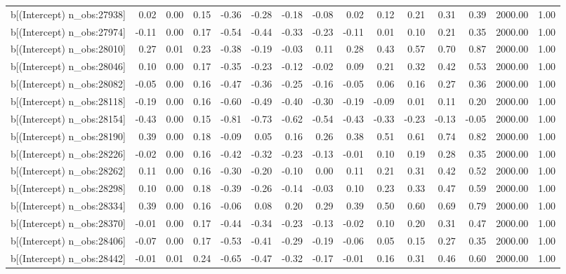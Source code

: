 \begin{table}[ht]
\begin{tabular}{rrrrrrrrrrrrrrr}
  b[(Intercept) n\_obs:27938] & 0.02 & 0.00 & 0.15 & -0.36 & -0.28 & -0.18 & -0.08 & 0.02 & 0.12 & 0.21 & 0.31 & 0.39 & 2000.00 & 1.00 \\ 
  b[(Intercept) n\_obs:27974] & -0.11 & 0.00 & 0.17 & -0.54 & -0.44 & -0.33 & -0.23 & -0.11 & 0.01 & 0.10 & 0.21 & 0.35 & 2000.00 & 1.00 \\ 
  b[(Intercept) n\_obs:28010] & 0.27 & 0.01 & 0.23 & -0.38 & -0.19 & -0.03 & 0.11 & 0.28 & 0.43 & 0.57 & 0.70 & 0.87 & 2000.00 & 1.00 \\ 
  b[(Intercept) n\_obs:28046] & 0.10 & 0.00 & 0.17 & -0.35 & -0.23 & -0.12 & -0.02 & 0.09 & 0.21 & 0.32 & 0.42 & 0.53 & 2000.00 & 1.00 \\ 
  b[(Intercept) n\_obs:28082] & -0.05 & 0.00 & 0.16 & -0.47 & -0.36 & -0.25 & -0.16 & -0.05 & 0.06 & 0.16 & 0.27 & 0.36 & 2000.00 & 1.00 \\ 
  b[(Intercept) n\_obs:28118] & -0.19 & 0.00 & 0.16 & -0.60 & -0.49 & -0.40 & -0.30 & -0.19 & -0.09 & 0.01 & 0.11 & 0.20 & 2000.00 & 1.00 \\ 
  b[(Intercept) n\_obs:28154] & -0.43 & 0.00 & 0.15 & -0.81 & -0.73 & -0.62 & -0.54 & -0.43 & -0.33 & -0.23 & -0.13 & -0.05 & 2000.00 & 1.00 \\ 
  b[(Intercept) n\_obs:28190] & 0.39 & 0.00 & 0.18 & -0.09 & 0.05 & 0.16 & 0.26 & 0.38 & 0.51 & 0.61 & 0.74 & 0.82 & 2000.00 & 1.00 \\ 
  b[(Intercept) n\_obs:28226] & -0.02 & 0.00 & 0.16 & -0.42 & -0.32 & -0.23 & -0.13 & -0.01 & 0.10 & 0.19 & 0.28 & 0.35 & 2000.00 & 1.00 \\ 
  b[(Intercept) n\_obs:28262] & 0.11 & 0.00 & 0.16 & -0.30 & -0.20 & -0.10 & 0.00 & 0.11 & 0.21 & 0.31 & 0.42 & 0.52 & 2000.00 & 1.00 \\ 
  b[(Intercept) n\_obs:28298] & 0.10 & 0.00 & 0.18 & -0.39 & -0.26 & -0.14 & -0.03 & 0.10 & 0.23 & 0.33 & 0.47 & 0.59 & 2000.00 & 1.00 \\ 
  b[(Intercept) n\_obs:28334] & 0.39 & 0.00 & 0.16 & -0.06 & 0.08 & 0.20 & 0.29 & 0.39 & 0.50 & 0.60 & 0.69 & 0.79 & 2000.00 & 1.00 \\ 
  b[(Intercept) n\_obs:28370] & -0.01 & 0.00 & 0.17 & -0.44 & -0.34 & -0.23 & -0.13 & -0.02 & 0.10 & 0.20 & 0.31 & 0.47 & 2000.00 & 1.00 \\ 
  b[(Intercept) n\_obs:28406] & -0.07 & 0.00 & 0.17 & -0.53 & -0.41 & -0.29 & -0.19 & -0.06 & 0.05 & 0.15 & 0.27 & 0.35 & 2000.00 & 1.00 \\ 
  b[(Intercept) n\_obs:28442] & -0.01 & 0.01 & 0.24 & -0.65 & -0.47 & -0.32 & -0.17 & -0.01 & 0.16 & 0.31 & 0.46 & 0.60 & 2000.00 & 1.00 \\ 

\end{tabular}
\end{table}
